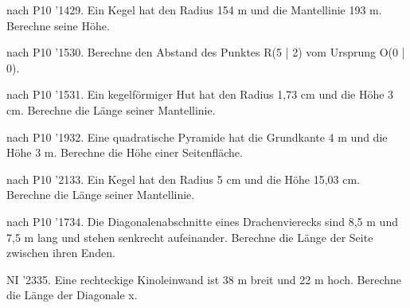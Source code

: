 \documentclass[11pt]{article}
\begin{document}
\pfgruppe{}
\begin{pfaufg}{nach P10 ’14}{29.}{}
Ein Kegel hat den Radius 154 m und die Mantellinie 193 m. Berechne seine Höhe.
\end{pfaufg}
\begin{pfaufg}{nach P10 ’15}{30.}{}
Berechne den Abstand des Punktes R(5 | 2) vom Ursprung O(0 | 0).
\end{pfaufg}
\begin{pfaufg}{nach P10 ’15}{31.}{}
Ein kegelförmiger Hut hat den Radius 1,73 cm und die Höhe 3 cm. Berechne die Länge seiner Mantellinie.
\end{pfaufg}
\begin{pfaufg}{nach P10 ’19}{32.}{}
Eine quadratische Pyramide hat die Grundkante 4 m und die Höhe 3 m. Berechne die Höhe einer Seitenfläche.
\end{pfaufg}
\begin{pfaufg}{nach P10 ’21}{33.}{}
Ein Kegel hat den Radius 5 cm und die Höhe 15,03 cm. Berechne die Länge seiner Mantellinie.
\end{pfaufg}
\pfgruppe{}
\begin{pfaufg}{nach P10 ’17}{34.}{}
Die Diagonalenabschnitte eines Drachenvierecks sind 8,5 m und 7,5 m lang und stehen senkrecht aufeinander. Berechne die Länge der Seite zwischen ihren Enden.
\end{pfaufg}
\pfgruppe{}
\begin{pfaufg}{NI ’23}{35.}{}
Eine rechteckige Kinoleinwand ist 38 m breit und 22 m hoch. Berechne die Länge der Diagonale x.
\par\smallskip\noindent {}\par
{}
\end{pfaufg}
\pfgruppe{}
\end{document}
